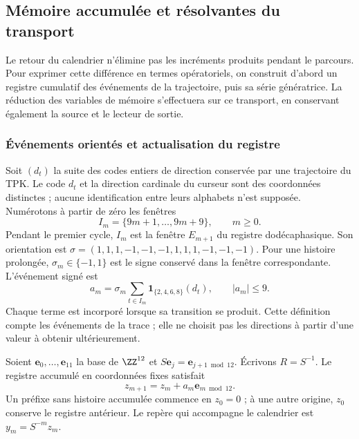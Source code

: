 \subsection{Mémoire accumulée et résolvantes du transport}
\label{subsec:memoria-resolvente}

Le retour du calendrier n'élimine pas les incréments produits pendant
le parcours. Pour exprimer cette différence en termes opératoriels, on construit
d'abord un registre cumulatif des événements de la trajectoire, puis sa
série génératrice. La réduction des variables de mémoire s'effectuera sur
ce transport, en conservant également la source et le lecteur de sortie.

\subsubsection{Événements orientés et actualisation du registre}

Soit \((d_t)\) la suite des codes entiers de direction conservée
par une trajectoire du TPK. Le code \(d_t\) et la direction cardinale
du curseur sont des coordonnées distinctes ; aucune identification
entre leurs alphabets n'est supposée. Numérotons à partir de zéro les fenêtres
\[
 I_m=\{9m+1,\ldots,9m+9\},\qquad m\geq0.
\]
Pendant le premier cycle, \(I_m\) est la fenêtre \(E_{m+1}\) du registre
dodécaphasique. Son orientation est
\(\sigma=(1,1,1,-1,-1,-1,1,1,1,-1,-1,-1)\).
Pour une histoire prolongée, \(\sigma_m\in\{-1,1\}\) est le signe
conservé dans la fenêtre correspondante. L’événement signé est
\begin{equation}
 a_m=\sigma_m\sum_{t\in I_m}
       \mathbf1_{\{2,4,6,8\}}(d_t),\qquad |a_m|\leq9.
 \label{mem:evento}
\end{equation}
Chaque terme est incorporé lorsque sa transition se produit. Cette définition
compte les événements de la trace ; elle ne choisit pas les directions à partir d'une valeur
à obtenir ultérieurement.

Soient \(\mathbf e_0,\ldots,\mathbf e_{11}\) la base de \(\ZZ^{12}\)
et \(S\mathbf e_j=\mathbf e_{j+1\bmod12}\). Écrivons
\(R=S^{-1}\). Le registre accumulé en coordonnées fixes satisfait
\[
z_{m+1}=z_m+a_m\mathbf e_{m\bmod12}.
\]
Un préfixe sans histoire accumulée commence en \(z_0=0\) ; à une autre
origine, \(z_0\) conserve le registre antérieur.
Le repère qui accompagne le calendrier est \(y_m=S^{-m}z_m\).


